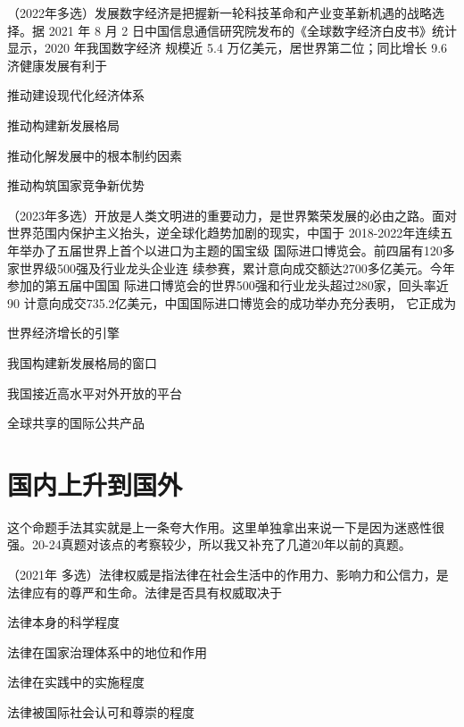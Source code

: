 \documentclass[lang=cn,newtx,10pt,scheme=chinese,pad,twocol]{zznote}
\begin{document}
\begin{example}	（2022年多选）发展数字经济是把握新一轮科技革命和产业变革新机遇的战略选择。据 2021 年 8 月 2
	日中国信息通信研究院发布的《全球数字经济白皮书》统计显示，2020 年我国数字经济
	规模近 5.4 万亿美元，居世界第二位；同比增长 9.6%
	济健康发展有利于
	\begin{choice}
		\item 推动建设现代化经济体系
		\item 推动构建新发展格局
		\item 推动化解发展中的根本制约因素
		\item 推动构筑国家竞争新优势
	\end{choice}
\end{example}

\begin{example} （2023年多选）开放是人类文明进的重要动力，是世界繁荣发展的必由之路。面对
	世界范围内保护主义抬头，逆全球化趋势加剧的现实，中国于
	2018-2022年连续五年举办了五届世界上首个以进口为主题的国宝级  国际进口博览会。前四届有120多家世界级500强及行业龙头企业连  续参赛，累计意向成交额达2700多亿美元。今年参加的第五届中国国 际进口博览会的世界500强和行业龙头超过280家，回头率近90%
	计意向成交735.2亿美元，中国国际进口博览会的成功举办充分表明，
	它正成为
	\begin{choice}
		\item 世界经济增长的引擎
		\item 我国构建新发展格局的窗口
		\item 我国接近高水平对外开放的平台
		\item 全球共享的国际公共产品
	\end{choice}
\end{example}



\section{国内上升到国外}
\begin{definition}
	这个命题手法其实就是上一条夸大作用。这里单独拿出来说一下是因为迷惑性很强。20-24真题对该点的考察较少，所以我又补充了几道20年以前的真题。
\end{definition}

\begin{example}
	（2021年 多选）法律权威是指法律在社会生活中的作用力、影响力和公信力，是法律应有的尊严和生命。法律是否具有权威取决于
	\begin{choice}
		\item 法律本身的科学程度
		\item 法律在国家治理体系中的地位和作用
		\item 法律在实践中的实施程度
		\item 法律被国际社会认可和尊崇的程度
	\end{choice}
\end{example}
\end{document}
